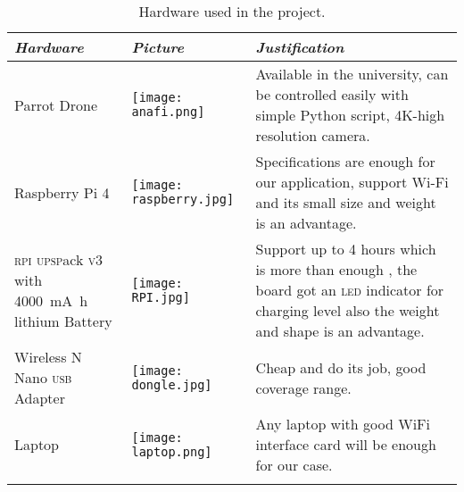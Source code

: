 \documentclass[../main.tex]{subfiles}
\begin{document}
\begin{table}[p]
	\centering
	\caption{Hardware used in the project.}
	\label{tab:hardware-used}  
	\begin{tabular}{ p{4cm} p{3cm} p{6cm} }
		\toprule
		\textit{Hardware} 
		& \textit{Picture} 
		& \textit{Justification} \\ 
		
		\midrule
		
		Parrot \anafi Drone  
		& \begin{minipage}{.1\textwidth}
			\texttt{[image: anafi.png]}
		\end{minipage} 
		& Available in the university, can be 
		controlled easily 
		with simple Python script, 
		4K-high resolution camera.  \\ 
		\addlinespace
		
		Raspberry Pi 4  
		& \begin{minipage}{.0\textwidth}
			\texttt{[image: raspberry.jpg]}
		\end{minipage} 
		& Specifications are enough for our 
		application, support Wi-Fi and its 
		small size and weight is an advantage.\\ 
		\addlinespace
		
		\textsc{rpi} \textsc{upsp}ack \textsc{v}3 with 
		\SI{4000}{\milli\ampere\hour} 
		lithium Battery  
		& \begin{minipage}{.1\textwidth}
			\texttt{[image: RPI.jpg]}
		\end{minipage}  
		& Support up to 4 hours which is more 
		than enough , the board got an \textsc{led} 
		indicator for charging level also the 
		weight and shape is an advantage.  \\ 
		\addlinespace
		
		Wireless N Nano \textsc{usb} Adapter  
		& \begin{minipage}{.1\textwidth}
			\texttt{[image: dongle.jpg]}
		\end{minipage} 
		& Cheap and do its job, good coverage 
		range.  \\ 
		\addlinespace
		
		Laptop 
		& \begin{minipage}{.1\textwidth}
			\texttt{[image: laptop.png]}
		\end{minipage} 
		& Any laptop with good WiFi interface 
		card will be enough for our case. \\ 
		\addlinespace
		
		\bottomrule
	\end{tabular}
\end{table}
\end{document}
